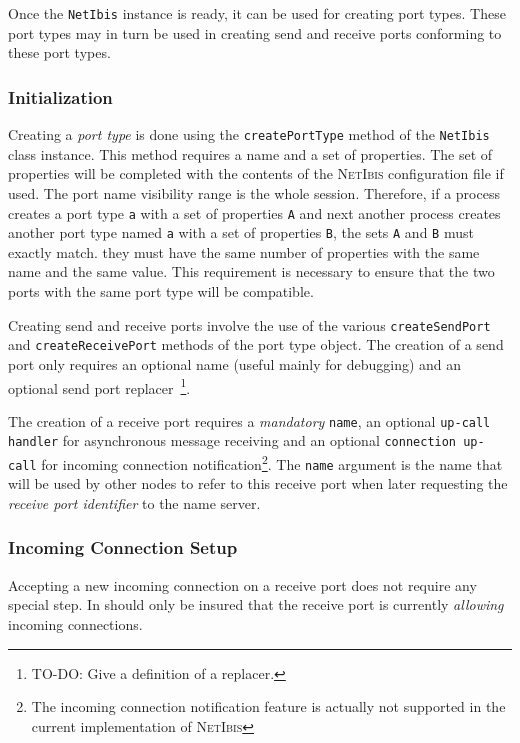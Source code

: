 \documentclass[11pt]{book}
\def\NetIbis{\textsc{NetIbis}\xspace}
\def\netibis{\texttt{NetIbis}\xspace}
\begin{document}
Once the \netibis instance is ready, it can be used for creating port
types. These port types may in turn be used in creating send and
receive ports conforming to these port types.

%
\subsubsection{Initialization}
\label{sec:initialization-2}

Creating a \emph{port type} is done using the \texttt{createPortType}
method of the \netibis class instance. This method requires a name and
a set of properties. The set of properties will be completed with the
contents of the \NetIbis configuration file if used. The port name
visibility range is the whole session. Therefore, if a process creates
a port type \texttt{a} with a set of properties \texttt{A} and next
another process creates another port type named \texttt{a} with a set
of properties \texttt{B}, the sets \texttt{A} and \texttt{B} must
exactly match. they must have the same number of properties with the
same name and the same value. This requirement is necessary to ensure
that the two ports with the same port type will be compatible.

Creating send and receive ports involve the use of the various
\texttt{createSendPort} and \texttt{createReceivePort} methods of the
port type object. The creation of a send port only requires an
optional name (useful mainly for debugging) and an optional send port
replacer~\footnote{TO-DO: Give a definition of a replacer.}.

The creation of a receive port requires a \emph{mandatory}
\texttt{name}, an optional \texttt{up-call handler} for asynchronous
message receiving and an optional \texttt{connection up-call} for
incoming connection notification\footnote{The incoming connection
  notification feature is actually not supported in the current
  implementation of \NetIbis}. The \texttt{name} argument is the name
that will be used by other nodes to refer to this receive port when
later requesting the \emph{receive port identifier} to the name server.

%
\subsubsection{Incoming Connection Setup}
\label{sec:incom-conn-setup}

Accepting a new incoming connection on a receive port does not require
any special step. In should only be insured that the receive port is
currently \emph{allowing} incoming connections.
\end{document}
